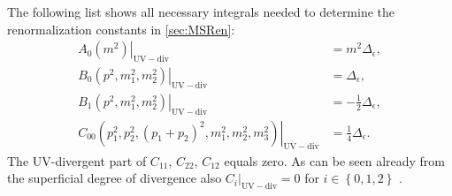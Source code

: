 The following list shows all necessary integrals needed to determine the renormalization constants in \ref{sec:MSRen}:
\begin{align}
\left.A_0(m^2)\right|_{\mathrm{UV-div}} &= m^2 \Delta_\epsilon,\\
\left.B_0(p^2,m_1^2,m_2^2)\right|_{\mathrm{UV-div}} &= \Delta_\epsilon, \\
\left.B_1(p^2,m_1^2,m_2^2)\right|_{\mathrm{UV-div}} &= -\frac{1}{2}\Delta_\epsilon,\\
\left.C_{00}(p_1^2,p_2^2,(p_1+p_2)^2,m_1^2,m_2^2,m_3^2)\right|_{\mathrm{UV-div}} &= \frac{1}{4}\Delta_\epsilon.
\end{align}
The UV-divergent part of $C_{11}$, $C_{22}$, $C_{12}$ equals zero. As can be seen already from the superficial degree of divergence also $C_i|_{\mathrm{UV-div}} = 0$ for $i \in \left\{ 0, 1, 2 \right\}$ .



